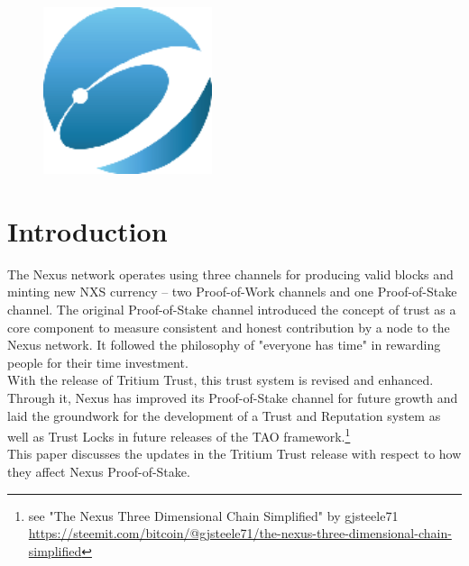 \documentclass[11pt]{article}
\title{\rmfamily\normalfont{Nexus Proof-of-Stake with Tritium Trust}}
\author{Colin Cantrell\\
\and Scott Simon}
\date{October 3, 2018}
\begin{document}

\begin{figure}
    \centering
	\includegraphics[width=0.44\textwidth]{images/logo.png}
\end{figure}

\maketitle

\newpage
{}

\bigskip

\section{Introduction}
The Nexus network operates using three channels for producing valid blocks and minting new NXS currency -- two Proof-of-Work channels and one Proof-of-Stake channel. The original Proof-of-Stake channel introduced the concept of trust as a core component to measure consistent and honest contribution by a node to the Nexus network. It followed the philosophy of "everyone has time" in rewarding people for their time investment.\\

\noindent With the release of Tritium Trust, this trust system is revised and enhanced. Through it, Nexus has improved its Proof-of-Stake channel for future growth and laid the groundwork for the development of a Trust and Reputation system as well as Trust Locks in future releases of the TAO framework.\footnote{see "The Nexus Three Dimensional Chain Simplified" by gjsteele71\\ \url{https://steemit.com/bitcoin/@gjsteele71/the-nexus-three-dimensional-chain-simplified}} \\ 

\noindent This paper discusses the updates in the Tritium Trust release with respect to how they affect Nexus Proof-of-Stake.
\end{document}
